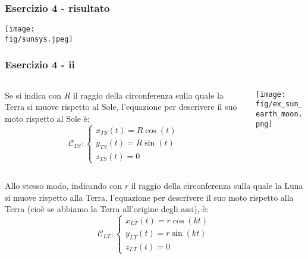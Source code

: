 \documentclass{beamer}
\newcommand{\fig}{figures} %
\begin{document}
\begin{frame}
\frametitle{Esercizio 4 - risultato}
\texttt{[image: \\fig/sunsys.jpeg]}
\end{frame}

\begin{frame}
	\frametitle{Esercizio 4 - ii}
	
	\begin{columns}
		\begin{column}{0.5\textwidth}
			Se si indica con $R$ il raggio della circonferenza sulla quale la Terra si muove rispetto al Sole, l'equazione per descrivere il suo moto rispetto al Sole \`e:
			\begin{displaymath}
			\mathcal{C}_{TS}:\begin{cases}
			x_{TS}(t)= R \cos(t)\\
			y_{TS}(t)= R \sin(t)\\
			z_{TS}(t)= 0
			\end{cases}
			\end{displaymath}
		\end{column}
		\begin{column}{0.5\textwidth}
			\texttt{[image: \\fig/ex\_sun\_earth\_moon.png]}
		\end{column}
	\end{columns}
\vspace{0.2cm}
    Allo stesso modo, indicando con $r$ il raggio della circonferenza sulla quale la Luna si muove rispetto alla Terra,  l'equazione per descrivere il suo moto rispetto alla Terra (cio\`e se abbiamo la Terra all'origine degli assi), \`e:
	\begin{displaymath}
	\mathcal{C}_{LT}:\begin{cases}
	x_{LT}(t)= r \cos(kt)\\
	y_{LT}(t)= r \sin(kt)\\
	z_{LT}(t)= 0
	\end{cases}
	\end{displaymath}
\end{frame}
\end{document}
